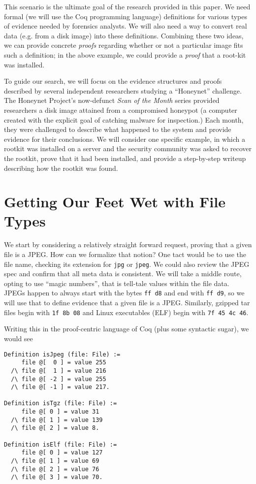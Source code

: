 \documentclass[nocopyrightspace]{sigplanconf}
\begin{document}
This scenario is the ultimate goal of the research provided in this paper. We
need formal (we will use the Coq programming language) definitions for various
types of evidence needed by forensics analysts. We will also need a way to
convert real data (e.g. from a disk image) into these definitions. Combining
these two ideas, we can provide concrete {\em proofs} regarding whether or not
a particular image fits such a definition; in the above example, we could
provide a {\em proof} that a root-kit was installed.

To guide our search, we will focus on the evidence structures and proofs
described by several independent researchers studying a ``Honeynet''
challenge. The Honeynet Project\cite{honeynet}'s now-defunct {\it Scan of the
Month} series provided researchers a disk image attained from a compromised
honeypot (a computer created with the explicit goal of catching malware for
inspection.) Each month, they were challenged to describe what happened to the
system and provide evidence for their conclusions. We will consider one
specific example\cite{honeynet-15}, in which a rootkit was installed on a
server and the security community was asked to recover the rootkit, prove that
it had been installed, and provide a step-by-step writeup describing how the
rootkit was found.

\section{Getting Our Feet Wet with File Types}

We start by considering a relatively straight forward request, proving that a
given file is a JPEG. How can we formalize that notion? One tact would be to
use the file name, checking its extension for {\tt jpg} or {\tt jpeg}. We
could also review the JPEG spec and confirm that all meta data is consistent.
We will take a middle route, opting to use ``magic numbers'', that is
tell-tale values within the file data. JPEGs happen to always start with the
bytes {\tt ff d8} and end with {\tt ff d9}, so we will use that to define
evidence that a given file is a JPEG. Similarly, gzipped tar files begin with
{\tt 1f 8b 08} and Linux executables (ELF) begin with {\tt 7f 45 4c 46}.

Writing this in the proof-centric language of Coq (plus some syntactic sugar),
we would see

\begin{lstlisting}
Definition isJpeg (file: File) :=
     file @[  0 ] = value 255
  /\ file @[  1 ] = value 216 
  /\ file @[ -2 ] = value 255
  /\ file @[ -1 ] = value 217.

Definition isTgz (file: File) :=
     file @[ 0 ] = value 31
  /\ file @[ 1 ] = value 139 
  /\ file @[ 2 ] = value 8.

Definition isElf (file: File) :=
     file @[ 0 ] = value 127
  /\ file @[ 1 ] = value 69 
  /\ file @[ 2 ] = value 76
  /\ file @[ 3 ] = value 70.
\end{lstlisting}
\end{document}
